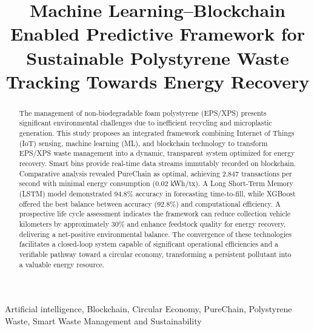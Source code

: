 \documentclass[final,5p,times,twocolumn]{elsarticle}
\begin{document}
\begin{frontmatter}

\title{Machine Learning–Blockchain Enabled Predictive Framework for Sustainable Polystyrene Waste Tracking Towards Energy Recovery}


\begin{abstract}
The management of non-biodegradable foam polystyrene (EPS/XPS) presents significant environmental challenges due to inefficient recycling and microplastic generation. This study proposes an integrated framework combining Internet of Things (IoT) sensing, machine learning (ML), and blockchain technology to transform EPS/XPS waste management into a dynamic, transparent system optimized for energy recovery. Smart bins provide real-time data streams immutably recorded on blockchain. Comparative analysis revealed PureChain as optimal, achieving 2,847 transactions per second with minimal energy consumption (0.02 kWh/tx). A Long Short-Term Memory (LSTM) model demonstrated 94.8\% accuracy in forecasting time-to-fill, while XGBoost offered the best balance between accuracy (92.8\%) and computational efficiency. A prospective life cycle assessment indicates the framework can reduce collection vehicle kilometers by approximately 30\% and enhance feedstock quality for energy recovery, delivering a net-positive environmental balance. The convergence of these technologies facilitates a closed-loop system capable of significant operational efficiencies and a verifiable pathway toward a circular economy, transforming a persistent pollutant into a valuable energy resource.
\end{abstract}

\begin{keyword}
Artificial intelligence, Blockchain, Circular Economy, PureChain, Polystyrene Waste, Smart Waste Management and Sustainability\end{keyword}
\end{frontmatter}
\end{document}
